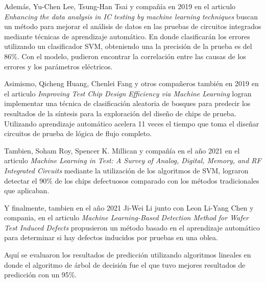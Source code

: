 Además, Yu-Chen Lee, Tsung-Han Tsai y compañía en 2019 en el articulo \textit{Enhancing the data analysis in IC testing by machine learning techniques} buscan un método para mejorar el análisis de datos en las pruebas de circuitos integrados mediante técnicas de aprendizaje automático. En donde clasificarán los errores utilizando un clasificador SVM, obteniendo una la precisión de la prueba es del 86\%. Con el modelo, pudieron encontrar la correlación entre las causas de los errores y los parámetros eléctricos.\par

Asimismo, Qicheng Huang, Chenlei Fang y otros compañeros también en 2019 en el articulo \textit{Improving Test Chip Design Efficiency via Machine Learning} logran implementar una técnica de clasificación aleatoria de bosques para predecir los resultados de la síntesis para la exploración del diseño de chips de prueba. Utilizando aprendizaje automático acelera 11 veces el tiempo que toma el diseñar circuitos de prueba de lógica de flujo completo.\par

Tambien, Soham Roy, Spencer K. Millican  y compañía en el año 2021 en el articulo \textit{Machine Learning in Test: A Survey of Analog, Digital, Memory, and RF Integrated Circuits} mediante la utilización de los algoritmos de SVM, lograron detectar el 90\% de los chips defectuosos comparado con los métodos tradicionales que aplicaban.\par

Y finalmente, tambien en el año 2021 Ji-Wei Li junto con Leon Li-Yang Chen y compania, en el articulo \textit{Machine Learning-Based Detection Method for Wafer Test Induced Defects} propusieron un método basado en el aprendizaje automático para determinar si hay defectos inducidos por pruebas en una oblea.\par

Aquí se evaluaron los resultados de predicción utilizando algoritmos lineales en donde el algoritmo de árbol de decisión fue el que tuvo mejores resultados de predicción con un 95\%.\par


